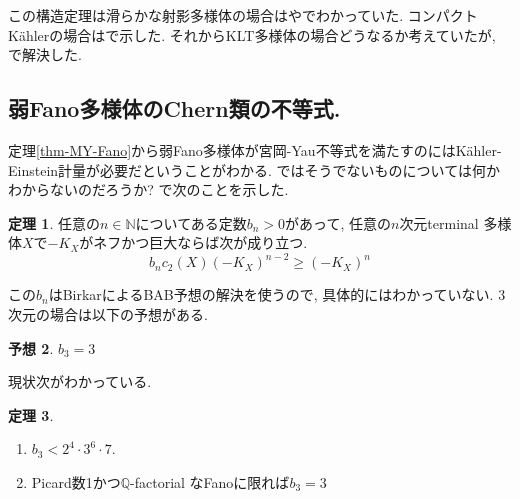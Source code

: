 \documentclass[dvipdfmx]{msjproc}
\theoremstyle{definition}
\newtheorem{thm}{定理}[section]
\newtheorem{conj}[thm]{予想}
\newcommand{\N}{\mathbb{N}}
\newcommand{\Q}{\mathbb{Q}}
\begin{document}
この構造定理は滑らかな射影多様体の場合は\cite{Cao13}や\cite{Ou17}でわかっていた. 
コンパクトK\"ahlerの場合は\cite{IM22}で示した.  
それからKLT多様体の場合どうなるか考えていたが, \cite{IMM24}で解決した.

\subsection{弱Fano多様体のChern類の不等式.}

定理\ref{thm-MY-Fano}から弱Fano多様体が宮岡-Yau不等式を満たすのにはK\"ahler-Einstein計量が必要だということがわかる. 
ではそうでないものについては何かわからないのだろうか? 
\cite{IJL23}で次のことを示した. 

\begin{thm}\cite{IJL23}
任意の$n \in \N$についてある定数$b_n>0$があって, 
任意の$n$次元terminal 多様体$X$で$-K_X$がネフかつ巨大ならば次が成り立つ. 
$$
b_n c_2(X) (-K_X)^{n-2} \ge (-K_X)^{n}
$$
\end{thm}
この$b_n$はBirkarによるBAB予想の解決を使うので, 具体的にはわかっていない. 
3次元の場合は以下の予想がある. 
\begin{conj}
\label{conj_b3}
$b_3 =3$
\end{conj}
現状次がわかっている. 
\begin{thm}
\begin{enumerate}
  \setlength{\parskip}{0cm} 
  \setlength{\itemsep}{0cm} 
  \item \cite{IJL23} $b_3 <2^4 \cdot 3^6 \cdot 7$.
  \item \cite{LL23}\cite{LL24} Picard数1かつ$\Q$-factorial なFanoに限れば$b_3 =3$
\end{enumerate}
\end{thm}
\end{document}
